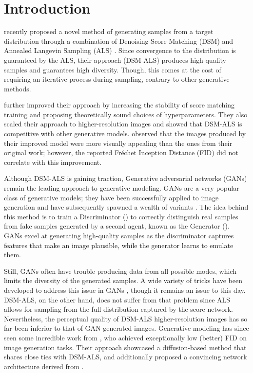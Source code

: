 \documentclass{article} \usepackage{iclr2021_conference_notitle,times}
\theoremstyle{definition}
\theoremstyle{definition}
\begin{document}
\section{Introduction}

\citet{song2019generative} recently proposed a novel method of generating samples from a target distribution through a combination of Denoising Score Matching (DSM) \citep{hyvarinen2005estimation, vincent2011connection, raphan2011least} and Annealed Langevin Sampling (ALS) \citep{welling2011bayesian,roberts1996exponential}. 
Since convergence to the distribution is guaranteed by the ALS, their approach (DSM-ALS) produces high-quality samples and guarantees high diversity. Though, this comes at the cost of requiring an iterative process during sampling, contrary to other generative methods.


\citet{song2020improved} further improved their approach by increasing the stability of score matching training and proposing theoretically sound choices of hyperparameters. They also scaled their approach to higher-resolution images and showed that DSM-ALS is competitive with other generative models.
\citet{song2020improved} observed that the images produced by their improved model were more visually appealing than the ones from their original work;
however, the reported Fréchet Inception Distance (FID) \citep{heusel2017gans} did not correlate with this improvement. 

Although DSM-ALS is gaining traction, Generative adversarial networks (GANs) \citep{GAN} remain the leading approach to generative modeling. GANs are a very popular class of generative models; they have been successfully applied to image generation \citep{brock2018large,karras2017progressive,karras2019style,karras2020analyzing} and have subsequently spawned a wealth of variants \citep{radford2015unsupervised,miyato2018spectral,jolicoeur2018relativistic,zhang2019self}. The idea behind this method is to train a Discriminator () to correctly distinguish real samples from fake samples generated by a second agent, known as the Generator (). GANs excel at generating high-quality samples as the discriminator captures features that make an image plausible, while the generator learns to emulate them.

Still, GANs often have trouble producing data from all possible modes, which limits the diversity of the generated samples. A wide variety of tricks have been developed to address this issue in GANs \citep{kodali2017convergence,WGAN-GP,WGAN,miyato2018spectral,jolicoeur2019connections}, though it remains an issue to this day. DSM-ALS, on the other hand, does not suffer from that problem since ALS allows for sampling from the full distribution captured by the score network. Nevertheless, the perceptual quality of DSM-ALS higher-resolution images has so far been inferior to that of GAN-generated images. Generative modeling has since seen some incredible work from \citet{ho2020denoising}, who achieved exceptionally low (better) FID on image generation tasks. Their approach showcased a diffusion-based method \citep{sohl2015deep, goyal2017variational} that shares close ties with DSM-ALS, and additionally proposed a convincing network architecture derived from \citet{salimans2017pixelcnn++}.
\end{document}
